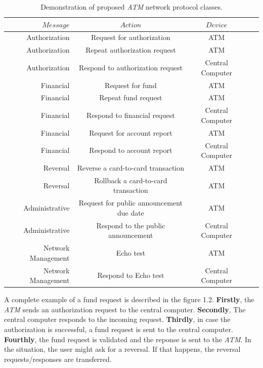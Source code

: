 \documentclass[12pt]{article}
\numberwithin{equation}{section}
\numberwithin{table}{section}
\numberwithin{figure}{section}
\begin{document}
\begin{table} \centering
	\begin{tabular}{rcccc}
		\hline
		$ Message $ &
		$ Action$ & $ Device $ \\
		\hline
		 Authorization & Request for authorization & ATM \\
		 Authorization & Repeat authorization request & ATM\\
		 Authorization & Respond to authorization request & Central Computer\\
		 Financial & Request for fund & ATM \\
		 Financial & Repeat fund request & ATM \\
		 Financial & Respond to financial request & Central Computer \\
		 Financial & Request for account report & ATM \\
		 Financial & Respond to account report & Central Computer \\
		 Reversal & Reverse a card-to-card transaction & ATM \\
		 Reversal & Rollback a card-to-card transaction & ATM \\
		 Administrative & Request for public announcement due date & ATM \\
		 Administrative & Respond to the public announcement & Central Computer \\
		 Network Management & Echo test & ATM \\
		 Network Management & Respond to Echo test & Central Computer\\
		 
		 
		\hline
	\end{tabular}
	\caption{Demonstration of proposed \textit{ATM} network protocol classes.}
	\label{tabconvdemo}
\end{table}

A complete example of a fund request is described in the figure 1.2. \textbf{Firstly}, the \textit{ATM} sends an authorization request to the central computer. \textbf{Secondly}, The central computer responds to the incoming request. \textbf{Thirdly}, in case the authorization is successful, a fund request is sent to the central computer. \textbf{Fourthly}, the fund request is validated and the reponse is sent to the \textit{ATM}. In the situation, the user might ask for a reversal. If that happens, the reversal requests/responses are transferred.
\end{document}
